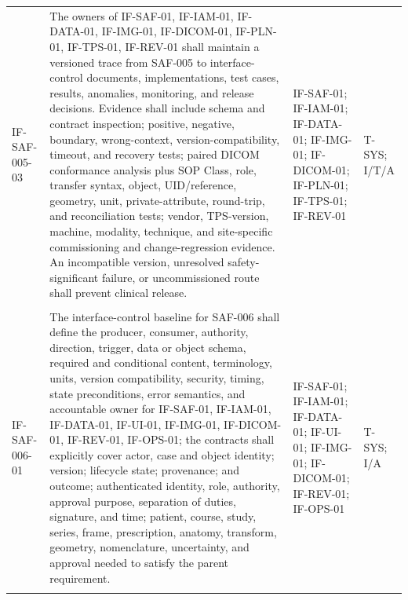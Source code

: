 \documentclass[11pt,letterpaper]{article}
\begin{document}
\begin{scriptsize}
\begin{longtable}{@{}L{0.14\textwidth}L{0.49\textwidth}L{0.19\textwidth}L{0.10\textwidth}@{}}
\addlinespace[2pt]
\mbox{IF-SAF-005-03} & The owners of IF-SAF-01, IF-IAM-01, IF-DATA-01, IF-IMG-01, IF-DICOM-01, IF-PLN-01, IF-TPS-01, IF-REV-01 shall maintain a versioned trace from SAF-005 to interface-control documents, implementations, test cases, results, anomalies, monitoring, and release decisions. Evidence shall include schema and contract inspection; positive, negative, boundary, wrong-context, version-compatibility, timeout, and recovery tests; paired DICOM conformance analysis plus SOP Class, role, transfer syntax, object, UID\slash\allowbreak{}reference, geometry, unit, private-attribute, round-trip, and reconciliation tests; vendor, TPS-version, machine, modality, technique, and site-specific commissioning and change-regression evidence. An incompatible version, unresolved safety-significant failure, or uncommissioned route shall prevent clinical release. & IF-SAF-01; IF-IAM-01; IF-DATA-01; IF-IMG-01; IF-DICOM-01; IF-PLN-01; IF-TPS-01; IF-REV-01 & T-SYS; I\slash\allowbreak{}T\slash\allowbreak{}A \\
\addlinespace[2pt]
 \\
\addlinespace[2pt]
\mbox{IF-SAF-006-01} & The interface-control baseline for SAF-006 shall define the producer, consumer, authority, direction, trigger, data or object schema, required and conditional content, terminology, units, version compatibility, security, timing, state preconditions, error semantics, and accountable owner for IF-SAF-01, IF-IAM-01, IF-DATA-01, IF-UI-01, IF-IMG-01, IF-DICOM-01, IF-REV-01, IF-OPS-01; the contracts shall explicitly cover actor, case and object identity; version; lifecycle state; provenance; and outcome; authenticated identity, role, authority, approval purpose, separation of duties, signature, and time; patient, course, study, series, frame, prescription, anatomy, transform, geometry, nomenclature, uncertainty, and approval needed to satisfy the parent requirement. & IF-SAF-01; IF-IAM-01; IF-DATA-01; IF-UI-01; IF-IMG-01; IF-DICOM-01; IF-REV-01; IF-OPS-01 & T-SYS; I\slash\allowbreak{}A \\
\addlinespace[2pt]

\end{longtable}
\end{scriptsize}
\end{document}

